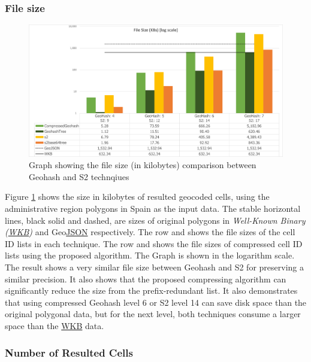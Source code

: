 \subsubsection*{File size}

\begin{figure}[htb!]
  \centering
  \includegraphics[width=\textwidth]{images/ResultsGSFileSize.png}
  \caption{Graph showing the file size (in kilobytes) comparison between Geohash and S2 technqiues}
  \label{fig:ResultsGSFileSize}
\end{figure}

\npara Figure \ref{fig:ResultsGSFileSize} shows the size in kilobytes of resulted geocoded cells, using the administrative region polygons in Spain as the input data.
The stable horizontal lines, black solid and dashed, are sizes of original polygons in \textit{Well-Known Binary (\hyperref[Acronym-WKB]{WKB})} and Geo\hyperref[Acronym-JSON]{JSON} respectively.
The row  and  shows the file sizes of the cell ID lists in each technique.
The row  and  shows the file sizes of compressed cell ID lists using the proposed algorithm.
The Graph is shown in the logarithm scale.
The result shows a very similar file size between Geohash and S2 for preserving a similar precision.
It also shows that the proposed compressing algorithm can significantly reduce the size from the prefix-redundant list.
It also demonstrates that using compressed Geohash level 6 or S2 level 14 can save disk space than the original polygonal data, but for the next level, both techniques consume a larger space than the \hyperref[Acronym-WKB]{WKB} data.

\subsubsection*{Number of Resulted Cells}

